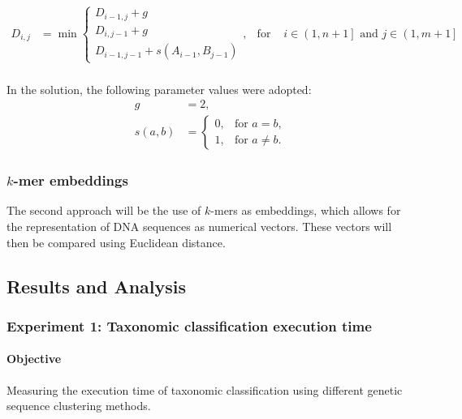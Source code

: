 \documentclass[pdflatex,sn-vancouver-num]{sn-jnl}%
\begin{document}
                \begin{equation}
                    \begin{aligned}
                        D_{i,j} &= \min
                        \begin{cases}
                        D_{i - 1, j} + g \\
                        D_{i, j - 1} + g \\
                        D_{i - 1, j - 1} + s(A_{i - 1}, B_{j - 1})
                        \end{cases}, & \text{for } & i \in \left(1, n + 1\right] \text{ and } j \in \left(1, m + 1\right] \\
                    \end{aligned}
                    \label{Equation:NeedlemanWunschModified}
                \end{equation}

                In the solution, the following parameter values were adopted:
                \begin{align*}
                    g &= 2, \\
                    s(a, b) &= \begin{cases}
                        0, & \text{for } a = b, \\
                        1, & \text{for } a \neq b.
                    \end{cases}
                \end{align*}

            \subsubsection{$k$-mer embeddings}
                The second approach will be the use of $k$-mers as embeddings, which allows for the representation of DNA sequences as numerical vectors. These vectors will then be compared using Euclidean distance.

        \subsection{Results and Analysis}
            \subsubsection{Experiment 1: Taxonomic classification execution time}
                \paragraph{Objective} 
                Measuring the execution time of taxonomic classification using different genetic sequence clustering methods.
\end{document}
